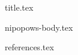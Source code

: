 \documentclass[11pt]{llncs}
\begin{document}
{title.tex}
\begin{abstract}

\end{abstract}
\thispagestyle{plain}
{nipopows-body.tex}
\newpage

{references.tex}
\end{document}

